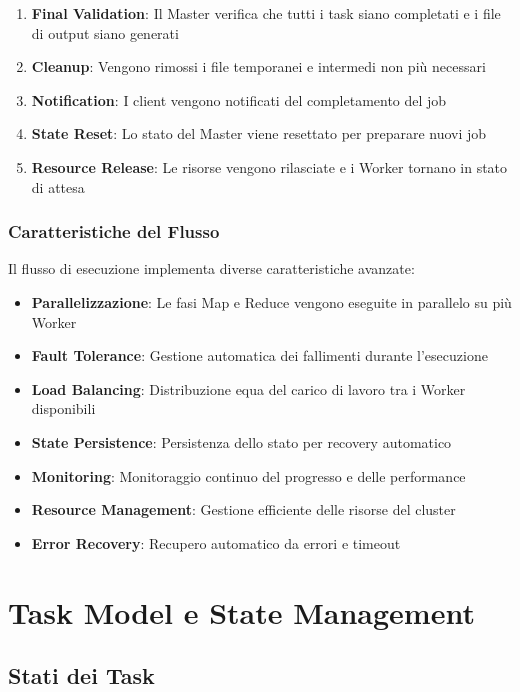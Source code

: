 \documentclass[12pt,a4paper]{article}
\begin{document}
\begin{enumerate}
\item \textbf{Final Validation}: Il Master verifica che tutti i task siano completati e i file di output siano generati
\item \textbf{Cleanup}: Vengono rimossi i file temporanei e intermedi non più necessari
\item \textbf{Notification}: I client vengono notificati del completamento del job
\item \textbf{State Reset}: Lo stato del Master viene resettato per preparare nuovi job
\item \textbf{Resource Release}: Le risorse vengono rilasciate e i Worker tornano in stato di attesa
\end{enumerate}

\subsubsection{Caratteristiche del Flusso}

Il flusso di esecuzione implementa diverse caratteristiche avanzate:

\begin{itemize}
\item \textbf{Parallelizzazione}: Le fasi Map e Reduce vengono eseguite in parallelo su più Worker
\item \textbf{Fault Tolerance}: Gestione automatica dei fallimenti durante l'esecuzione
\item \textbf{Load Balancing}: Distribuzione equa del carico di lavoro tra i Worker disponibili
\item \textbf{State Persistence}: Persistenza dello stato per recovery automatico
\item \textbf{Monitoring}: Monitoraggio continuo del progresso e delle performance
\item \textbf{Resource Management}: Gestione efficiente delle risorse del cluster
\item \textbf{Error Recovery}: Recupero automatico da errori e timeout
\end{itemize}

\section{Task Model e State Management}

\subsection{Stati dei Task}
\end{document}

